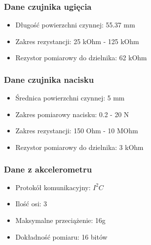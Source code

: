 \documentclass[12pt,a4paper]{article}
\begin{document}
\subsubsection{Dane czujnika ugięcia}
\begin{itemize}
\item Długość powierzchni czynnej: 55.37 mm
\item Zakres rezystancji: 25 kOhm - 125 kOhm
\item Rezystor pomiarowy do dzielnika: 62 kOhm
\end{itemize}
\subsubsection{Dane czujnika nacisku}
\begin{itemize}
\item Średnica powierzchni czynnej: 5 mm
\item Zakres pomiarowy nacisku: 0.2 - 20 N
\item Zakres rezystancji: 150 Ohm - 10 MOhm
\item Rezystor pomiarowy do dzielnika: 3 kOhm
\end{itemize}
\subsubsection{Dane z akcelerometru}
\begin{itemize}
\item Protokół komunikacyjny: $I^2C$
\item Ilość osi: 3
\item Maksymalne przeciążenie: 16g
\item Dokładność pomiaru: 16 bitów 
\end{itemize}
\end{document}

